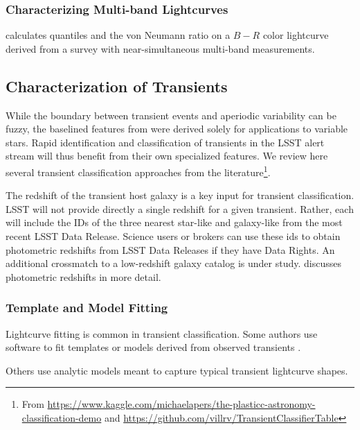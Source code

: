 \documentclass[DM,authoryear,toc]{lsstdoc}
\begin{document}
\subsubsection{Characterizing Multi-band Lightcurves}


\citet{Kim:14:The-EPOCH-Proje} calculates quantiles and the von Neumann ratio on a $B-R$ color lightcurve derived from a survey with near-simultaneous multi-band measurements.

\subsection{Characterization of Transients}

While the boundary between transient events and aperiodic variability can be fuzzy, the baselined features from \citet{2011ApJ...733...10R} were derived solely for applications to variable stars.
Rapid identification and classification of transients in the LSST alert stream will thus benefit from their own specialized features.
We review here several transient classification approaches from the literature\footnote{From \url{https://www.kaggle.com/michaelapers/the-plasticc-astronomy-classification-demo} and \url{https://github.com/villrv/TransientClassifierTable}}.

The redshift of the transient host galaxy is a key input for transient classification.
LSST will not provide directly a single redshift for a given transient.
Rather, each \DIAObject will include the IDs of the three nearest star-like and galaxy-like \Objects from the most recent LSST Data Release. 
Science users or brokers can use these ids to obtain photometric redshifts from LSST Data Releases if they have Data Rights.
An additional crossmatch to a low-redshift galaxy catalog is under study.
 discusses photometric redshifts in more detail.

\subsubsection{Template and Model Fitting}

Lightcurve fitting is common in transient classification.
Some authors use software \citep[e.g.,][]{Jha:07:IaLCFitter,Kessler:09:SNANA,Sako:11:PSNid,Barbary:14:sncosmo,Guillochon:18:MOSFiT}
to fit templates or models derived from observed transients \citep[e.g.,][]{Nugent:02:IaTemplates,Guy:07:SALT2, Conley:08:SiFTO, Kessler:19:PlasticcModels, Vincenzi:19:CCTemplates}.

Others use analytic models meant to capture typical transient lightcurve shapes.
\end{document}
